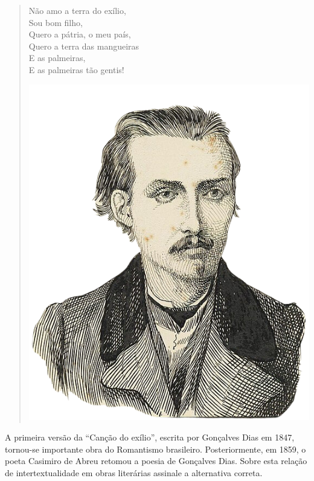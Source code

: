 \begin{myquote}
\begin{verse}
\begin{minipage}{0.5\textwidth}
Não amo a terra do exílio, \\
\qquad Sou bom filho, \\
Quero a pátria, o meu país, \\
Quero a terra das mangueiras \\
\qquad E as palmeiras, \\
E as palmeiras tão gentis! 
\end{minipage}
\hfill
\begin{minipage}{0.45\textwidth}
  \centering
  \includegraphics[width=\textwidth]{./imgSAEB_7_POR/media/image37.png}
\end{minipage}

\end{verse}


\end{myquote}

A primeira versão da ``Canção do exílio'', escrita por Gonçalves Dias em 1847,
tornou-se importante obra do Romantismo brasileiro. Posteriormente, em 1859, o
poeta Casimiro de Abreu retomou a poesia de Gonçalves Dias. Sobre esta relação
de intertextualidade em obras literárias assinale a alternativa correta.

